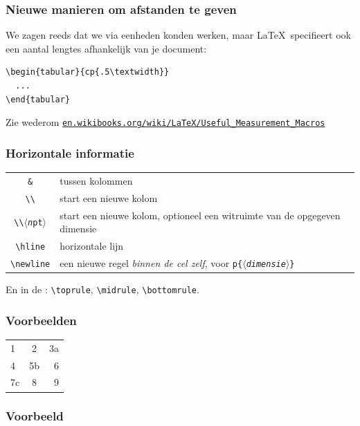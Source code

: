 \begin{frame}[fragile]
  \frametitle{Nieuwe manieren om afstanden te geven}

  We zagen reeds dat we via eenheden konden werken, maar \LaTeX\ specifieert ook een aantal lengtes afhankelijk van je document:
  \begin{verbatim}
\begin{tabular}{cp{.5\textwidth}}
  ...
\end{tabular}
  \end{verbatim}

  Zie wederom \href{http://en.wikibooks.org/wiki/LaTeX/Useful_Measurement_Macros}{\texttt{en.wikibooks.org/wiki/LaTeX/Useful\_Measurement\_Macros}}
\end{frame}

\begin{frame}[fragile]
  \frametitle{Horizontale informatie}

  \begin{tabular}{cp{}}
    \texttt{\&} & tussen kolommen \\
    \texttt{\textbackslash\textbackslash} & start een nieuwe kolom \\
    \texttt{\textbackslash\textbackslash$\langle$\textsl{n}pt$\rangle$} & start een nieuwe kolom, optioneel een witruimte van de opgegeven dimensie \\
    \texttt{\textbackslash hline} & horizontale lijn \\
    \texttt{\textbackslash newline} & een nieuwe regel \emph{binnen de cel zelf}, voor \texttt{p\{$\langle$\textsl{dimensie}$\rangle$\}}
  \end{tabular} 

  En in de : \verb|\toprule|, \verb|\midrule|, \verb|\bottomrule|.
\end{frame}

\begin{frame}[fragile]
  \frametitle{Voorbeelden}

  \begin{LTXexample}
\begin{tabular}{lcr}
  1 & 2 & 3a \\
  4 & 5b & 6 \\
  7c & 8 & 9
\end{tabular} 
  \end{LTXexample}
\end{frame}

\begin{frame}[fragile]
  \frametitle{Voorbeeld}

  \inputminted{tex}{table-example.tex}
\end{frame}

